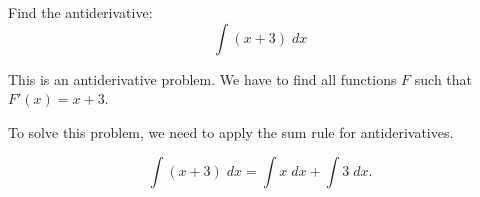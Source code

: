 \documentclass{ximera}
\author{Emma Smith Zbarsky\and Nela Lakos}
\begin{document}
\begin{exercise}

Find the antiderivative: \[\int (x+3)\; dx\]


\begin{hint}
This is an antiderivative problem. We have to find all functions
$F$ such that $F'(x) = x+3$.
\end{hint}


\begin{hint}
To solve this problem, we need to apply the sum rule for antiderivatives.

\[\int (x+3) \; dx = \int x \; dx+\int 3 \; dx.\]
\end{hint}


\begin{multipleChoice}
\end{multipleChoice}

\end{exercise}
\end{document}
